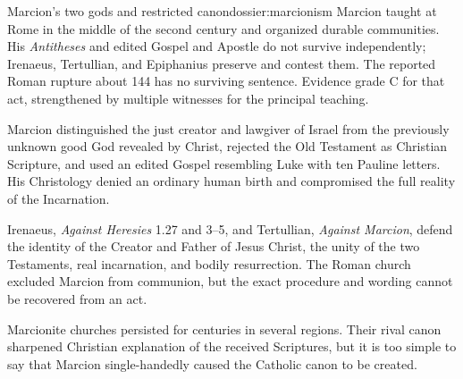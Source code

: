 \begin{heresydossier}{Marcion's two gods and restricted canon}{dossier:marcionism}
\objectfield Marcion taught at Rome in the middle of the second century and organized durable communities. His \emph{Antitheses} and edited Gospel and Apostle do not survive independently; Irenaeus, Tertullian, and Epiphanius preserve and contest them. The reported Roman rupture about 144 has no surviving sentence. Evidence grade C for that act, strengthened by multiple witnesses for the principal teaching.

\propositionfield Marcion distinguished the just creator and lawgiver of Israel from the previously unknown good God revealed by Christ, rejected the Old Testament as Christian Scripture, and used an edited Gospel resembling Luke with ten Pauline letters. His Christology denied an ordinary human birth and compromised the full reality of the Incarnation.

\responsefield Irenaeus, \emph{Against Heresies} 1.27 and 3--5, and Tertullian, \emph{Against Marcion}, defend the identity of the Creator and Father of Jesus Christ, the unity of the two Testaments, real incarnation, and bodily resurrection. The Roman church excluded Marcion from communion, but the exact procedure and wording cannot be recovered from an act.

\aftermathfield Marcionite churches persisted for centuries in several regions. Their rival canon sharpened Christian explanation of the received Scriptures, but it is too simple to say that Marcion single-handedly caused the Catholic canon to be created.
\end{heresydossier}

